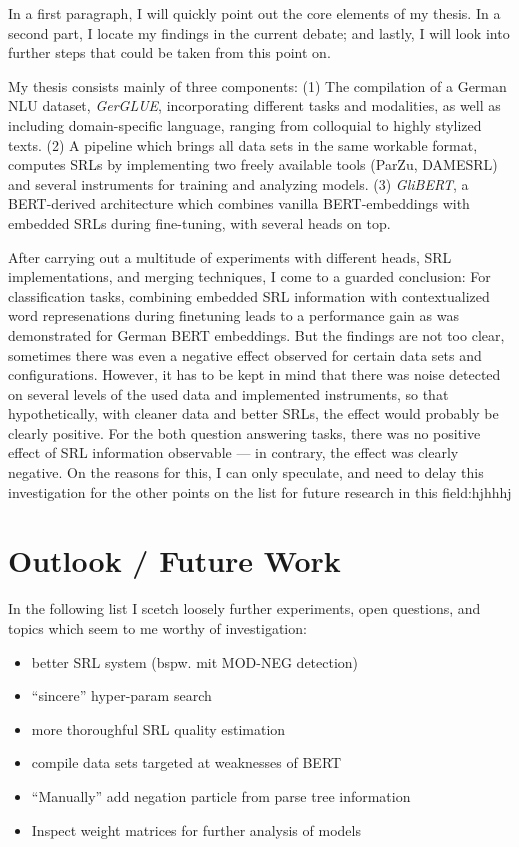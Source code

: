 \label{chap:6_conclusion}


In a first paragraph, I will quickly point out the core elements of my thesis. In a second part, I
locate my findings in the current debate; and lastly, I will look into further steps that could be
taken from this point on.

My thesis consists mainly of three components: (1) The compilation of a German NLU
dataset, \emph{GerGLUE}, incorporating different tasks and modalities, as well as
including domain-specific language, ranging from colloquial to highly stylized texts.
(2) A pipeline which brings all data sets in the same workable format, computes SRLs
by implementing two freely available tools (ParZu, DAMESRL) and several instruments
for training and analyzing models. (3) \emph{GliBERT}, a BERT-derived architecture
which combines vanilla BERT-embeddings with embedded SRLs during fine-tuning, with
several heads on top.

After carrying out a multitude of experiments with different heads, SRL implementations,
and merging techniques, I come to a guarded conclusion: For classification tasks, combining
embedded SRL information with contextualized word represenations during finetuning leads to
a performance gain as was demonstrated for German BERT embeddings. But the findings are not
too clear, sometimes there was even a negative effect observed for certain data sets and
configurations. However, it has to be kept in mind that there was noise detected on several
levels of the used data and implemented instruments, so that hypothetically, with cleaner
data and better SRLs, the effect would probably be clearly positive. For the both question
answering tasks, there was no positive effect of SRL information observable --- in contrary,
the effect was clearly negative. On the reasons for this, I can only speculate, and need
to delay this investigation for the other points on the list for future research in this field:hjhhhj



\section{Outlook / Future Work}

In the following list I scetch loosely further experiments, open questions, and topics which
seem to me worthy of investigation:

\begin{itemize}
  \item better SRL system (bspw. mit MOD-NEG detection)
  \item ``sincere'' hyper-param search
  \item more thoroughful SRL quality estimation
  \item compile data sets targeted at weaknesses of BERT
  \item ``Manually'' add negation particle from parse tree information
  \item Inspect weight matrices for further analysis of models
\end{itemize}


